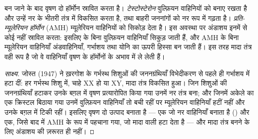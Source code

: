 \begin{proposition}[गर्भस्थ वृषण के हॉर्मोन]\label{prop:g11:becoming-male-female:hormones}
बन जाने के बाद वृषण दो हॉर्मोन स्रावित करता है।
\emph{टेस्टोस्टेरोन} वुल्फ़ियन वाहिनियों को बनाए रखता
है और उन्हें नर के भीतरी तंत्र में विकसित करता है, तथा बाहरी जननांगों को
नर रूप में गढ़ता है। \emph{प्रति-म्यूलेरियन हॉर्मोन} (AMH) म्यूलेरियन
वाहिनियों को सिकोड़ देता है। इस अवस्था पर अंडाशय इनमें से कोई नहीं स्रावित
करता: इसलिए  के बिना वुल्फ़ियन वाहिनियाँ सिकुड़ जाती हैं, और
AMH के बिना म्यूलेरियन वाहिनियाँ अंडवाहिनियाँ, गर्भाशय तथा योनि का ऊपरी
हिस्सा बन जाती हैं। इस तरह मादा तंत्र वही रूप है जो वे वाहिनियाँ वृषण के
हॉर्मोनों के अभाव में ले लेती हैं।
\end{proposition}
\begin{proof}[साक्ष्य]
जोस्त (1947) ने ख़रगोश के गर्भस्थ शिशुओं की जननग्रंथियाँ विभेदीकरण से पहले ही
गर्भाशय में हटा दीं: हर गर्भस्थ शिशु में, चाहे XX हो या XY, मादा तंत्र
विकसित हुआ। जिन शिशुओं की जननग्रंथियाँ हटाकर उनके बग़ल में वृषण प्रत्यारोपित
किया गया उनमें नर तंत्र बना; और जिनमें अकेले  का एक क्रिस्टल
बिठाया गया उनमें वुल्फ़ियन वाहिनियाँ तो बची रहीं पर म्यूलेरियन वाहिनियाँ
हटीं नहीं और उनके बग़ल में टिकी रहीं। इसलिए वृषण दो उत्पाद बनाता है ---
एक जो नर वाहिनियाँ बनाता है () और एक, जिसे बाद में AMH के रूप
में पहचाना गया, जो मादा वाली हटा देता है --- और मादा तंत्र बनने के लिए
अंडाशय की ज़रूरत ही नहीं।
\end{proof}

